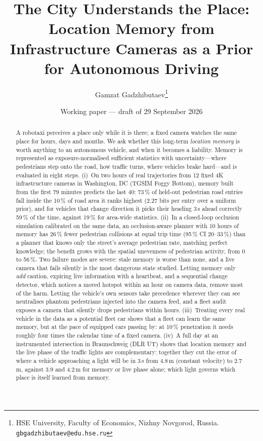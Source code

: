 \documentclass[11pt,a4paper]{article}
\title{\textbf{The City Understands the Place:}\\[2pt]
Location Memory from Infrastructure Cameras as a Prior for Autonomous Driving}
\author{Gamzat Gadzhibutaev\thanks{HSE University, Faculty of Economics, Nizhny Novgorod, Russia.
\texttt{gbgadzhibutaev@edu.hse.ru}}}
\date{Working paper --- draft of 29 September 2026}
\newcommand{\pct}{\,\%}
\begin{document}
\maketitle

\begin{abstract}
A robotaxi perceives a place only while it is there; a fixed camera watches the same place for hours, days and months.
We ask whether this long-term \emph{location memory} is worth anything to an autonomous vehicle, and when it becomes a liability.
Memory is represented as exposure-normalised sufficient statistics with uncertainty---where pedestrians step onto the road, how traffic turns, where vehicles brake hard---and is evaluated in eight steps.
(i)~On two hours of real trajectories from 12 fixed 4K infrastructure cameras in Washington, DC (TGSIM Foggy Bottom), memory built from the first 79 minutes predicts the last 40:
73\pct{} of held-out pedestrian road entries fall inside the 10\pct{} of road area it ranks highest (2.27 bits per entry over a uniform prior), and for vehicles that change direction it picks their heading 3\,s ahead correctly 59\pct{} of the time, against 19\pct{} for area-wide statistics.
(ii)~In a closed-loop occlusion simulation calibrated on the same data, an occlusion-aware planner with 10 hours of memory has 26\pct{} fewer pedestrian collisions at equal trip time (95\pct{} CI 20--33\pct) than a planner that knows only the street's average pedestrian rate, matching perfect knowledge; the benefit grows with the spatial unevenness of pedestrian activity, from 0 to 56\pct.
Two failure modes are severe: stale memory is worse than none, and a live camera that fails silently is the most dangerous state studied. Letting memory only \emph{add} caution, expiring live information with a heartbeat, and a sequential change detector, which notices a moved hotspot within an hour on camera data, remove most of the harm. Letting the vehicle's own sensors take precedence wherever they can see neutralises phantom pedestrians injected into the camera feed, and a fleet audit exposes a camera that silently drops pedestrians within hours.
(iii)~Treating every real vehicle in the data as a potential fleet car shows that a fleet can learn the same memory, but at the pace of equipped cars passing by: at 10\pct{} penetration it needs roughly four times the calendar time of a fixed camera.
(iv)~A full day at an instrumented intersection in Braunschweig (DLR UT) shows that location memory and the live phase of the traffic lights are complementary: together they cut the error of where a vehicle approaching a light will be in 3\,s from 4.8\,m (constant velocity) to 2.7\,m, against 3.9 and 4.2\,m for memory or live phase alone; which light governs which place is itself learned from memory.

\end{abstract}
\end{document}

